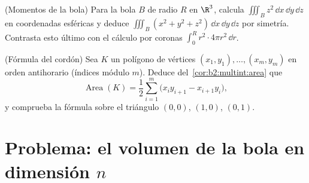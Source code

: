 \begin{exercise}[$\star\star$]\label{exo:b2:multint:11}
(Momentos de la bola) Para la bola $B$ de radio $R$ en $\R^3$,
calcula $\iiint_B z^2\,\dd x\,\dd y\,\dd z$ en coordenadas esféricas
y deduce $\iiint_B (x^2 + y^2 + z^2)\,\dd x\,\dd y\,\dd z$ por
simetría. Contrasta esto último con el cálculo por coronas $\int_0^R
r^2\cdot4\pi r^2\,\dd r$.
\end{exercise}

\begin{exercise}[$\star\star$]\label{exo:b2:multint:12}
(Fórmula del cordón) Sea $K$ un polígono de vértices $(x_1, y_1),
\dots, (x_m, y_m)$ en orden antihorario (índices módulo $m$). Deduce
del~\cref{cor:b2:multint:area} que
\[
\operatorname{Area}(K)
= \frac12\sum_{i=1}^m
\bigl(x_iy_{i+1} - x_{i+1}y_i\bigr) ,
\]
y comprueba la fórmula sobre el triángulo $(0,0)$, $(1,0)$, $(0,1)$.
\end{exercise}

\section{Problema: el volumen de la bola en dimensión $n$}

